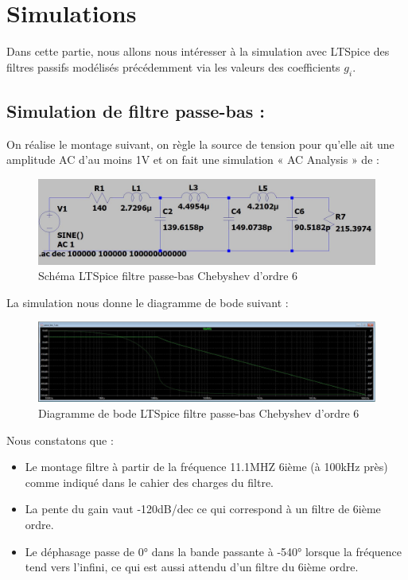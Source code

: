 \section{Simulations} 

Dans cette partie, nous allons nous intéresser à la simulation avec LTSpice des filtres passifs modélisés précédemment via les valeurs des coefficients $g_i$. 

\subsection{Simulation de filtre passe-bas : }

On réalise le montage suivant, on règle la source de tension pour qu’elle ait une amplitude AC d’au moins 1V et on fait une simulation « AC Analysis » de  : 

\begin{figure}[!htbp]
    \includegraphics[width=\textwidth,height=\textheight,keepaspectratio]{src/circuits/circuit_passe_basLT.JPG}
    \centering
    \caption{Schéma LTSpice filtre passe-bas Chebyshev d'ordre 6}
\end{figure}
\FloatBarrier

\newpage
La simulation nous donne le diagramme de bode suivant : 

\begin{figure}[!htbp]
\includegraphics[width=\textwidth,height=\textheight,keepaspectratio]{img_simule/passe_bas_simule.JPG}
    \centering
    \caption{Diagramme de bode LTSpice filtre passe-bas Chebyshev d'ordre 6}
\end{figure}
\FloatBarrier

Nous constatons que : 
\begin{itemize}
  \item Le montage filtre à partir de la fréquence 11.1MHZ 6ième (à 100kHz près) comme indiqué dans le cahier des charges du filtre.
  \item La pente du gain vaut -120dB/dec ce qui correspond à un filtre de 6ième ordre. 
  \item Le déphasage passe de 0° dans la bande passante à -540° lorsque la fréquence tend vers l’infini, ce qui est aussi attendu d’un filtre du 6ième ordre. 
\end{itemize}

